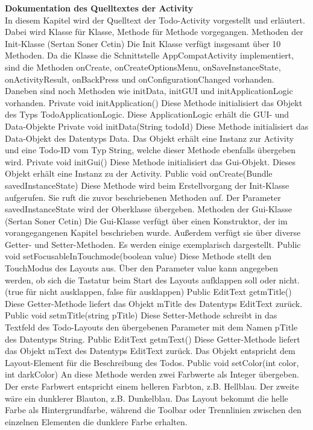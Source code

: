 \textbf{Dokumentation des Quelltextes der Activity}\\
In diesem Kapitel wird der Quelltext der Todo-Activity vorgestellt und erläutert. Dabei wird Klasse für Klasse, Methode für Methode vorgegangen. 
Methoden der Init-Klasse (Sertan Soner Cetin)
Die Init Klasse verfügt insgesamt über 10 Methoden. Da die Klasse die Schnittstelle AppCompatActivity implementiert, sind die Methoden onCreate, onCreateOptionsMenu, onSaveInstanceState, onActivityResult, onBackPress und onConfigurationChanged vorhanden. Daneben sind noch Methoden wie initData, initGUI und initApplicationLogic vorhanden.
Private void initApplication() 
Diese Methode initialisiert das Objekt des Typs TodoApplicationLogic. Diese ApplicationLogic erhält die GUI- und Data-Objekte
Private void initData(String todoId)
Diese Methode initialisiert das Data-Objekt des Datentyps Data. Das Objekt erhält eine Instanz zur Activity und eine Todo-ID vom Typ String, welche dieser Methode ebenfalls übergeben wird.
Private void initGui()
Diese Methode initialisiert das Gui-Objekt. Dieses Objekt erhält eine Instanz zu der Activity.
Public void onCreate(Bundle savedInstanceState)
Diese Methode wird beim Erstellvorgang der Init-Klasse aufgerufen. Sie ruft die zuvor beschriebenen Methoden auf. Der Parameter savedInstanceState wird der Oberklasse übergeben.
Methoden der Gui-Klasse (Sertan Soner Cetin)
Die Gui-Klasse verfügt über einen Konstruktor, der im vorangegangenen Kapitel beschrieben wurde. Außerdem verfügt sie über diverse Getter- und Setter-Methoden. Es werden einige exemplarisch dargestellt.
Public void setFocusableInTouchmode(boolean value)
Diese Methode stellt den TouchModus des Layouts aus. Über den Parameter value kann angegeben werden, ob sich die Tastatur beim Start des Layouts aufklappen soll oder nicht. (true für nicht ausklappen, false für ausklappen)
Public EditText getmTitle()
	Diese Getter-Methode liefert das Objekt mTitle des Datentyps EditText zurück.
Public void setmTitle(string pTitle)
Diese Setter-Methode schreibt in das Textfeld des Todo-Layouts den übergebenen Parameter mit dem Namen pTitle des Datentyps String.
Public EditText getmText()
Diese Getter-Methode liefert das Objekt mText des Datentyps EditText zurück. Das Objekt entspricht dem Layout-Element für die Beschreibung des Todos.
Public void setColor(int color, int darkColor)
An diese Methode werden zwei Farbwerte als Integer übergeben. Der erste Farbwert entspricht einem helleren Farbton, z.B. Hellblau. Der zweite wäre ein dunklerer Blauton, z.B. Dunkelblau. Das Layout bekommt die helle Farbe als Hintergrundfarbe, während die Toolbar oder Trennlinien zwischen den einzelnen Elementen die dunklere Farbe erhalten.

